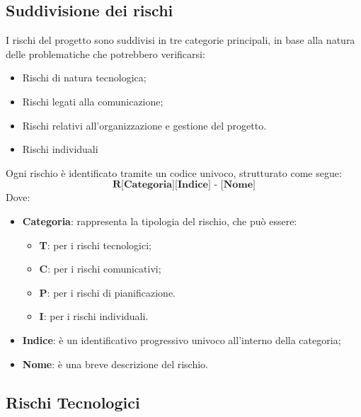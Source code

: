 \documentclass{article}
\begin{document}
    \subsection{Suddivisione dei rischi}
    I rischi del progetto sono suddivisi in tre categorie principali, in base alla natura delle problematiche che potrebbero verificarsi:
    \begin{itemize}
        \item Rischi di natura tecnologica;
        \item Rischi legati alla comunicazione;
        \item Rischi relativi all'organizzazione e gestione del progetto.
        \item Rischi individuali
    \end{itemize}
    Ogni rischio è identificato tramite un codice univoco, strutturato come segue:
    \[
    \textbf{R[Categoria][Indice] - [Nome]}
    \]
    Dove:
    \begin{itemize}
        \item \textbf{Categoria}: rappresenta la tipologia del rischio, che può essere:
        \begin{itemize}
            \item \textbf{T}: per i rischi tecnologici;
            \item \textbf{C}: per i rischi comunicativi;
            \item \textbf{P}: per i rischi di pianificazione.
            \item \textbf{I}: per i rischi individuali.
        \end{itemize}
        \item \textbf{Indice}: è un identificativo progressivo univoco all'interno della categoria;
        \item \textbf{Nome}: è una breve descrizione del rischio.
    \end{itemize}

    \subsection{Rischi Tecnologici}
\end{document}
